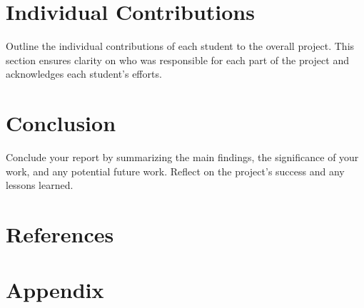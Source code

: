 \documentclass[notitlepage]{article}
\begin{document}
\section*{Individual Contributions}
\label{sec:contributions}
Outline the individual contributions of each student to the overall project. This section ensures clarity on who was responsible for each part of the project and acknowledges each student's efforts.

\section*{Conclusion}
\label{sec:conclusion}
Conclude your report by summarizing the main findings, the significance of your work, and any potential future work. Reflect on the project's success and any lessons learned.

\section*{References}

\section*{Appendix}
\end{document}
